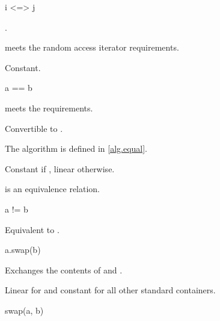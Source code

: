 \begin{itemdecl}
i <=> j
\end{itemdecl}

\begin{itemdescr}
\pnum
\result
{}.

\pnum
\constraints
{} meets the random access iterator requirements.

\pnum
\complexity
Constant.
\end{itemdescr}

%
\begin{itemdecl}
a == b
\end{itemdecl}

\begin{itemdescr}
\pnum
\expects
{} meets the  requirements.

\pnum
\result
Convertible to .

\pnum
\returns
{}

\begin{note}
The algorithm  is defined in \ref{alg.equal}.
\end{note}

\pnum
\complexity
Constant if , linear otherwise.

\pnum
\remarks
\tcode{==} is an equivalence relation.
\end{itemdescr}

%
\begin{itemdecl}
a != b
\end{itemdecl}

\begin{itemdescr}
\pnum
\effects
Equivalent to .
\end{itemdescr}

%
\begin{itemdecl}
a.swap(b)
\end{itemdecl}

\begin{itemdescr}
\pnum
\result
{}

\pnum
\effects
Exchanges the contents of  and .

\pnum
\complexity
Linear for  and constant for all other standard containers.
\end{itemdescr}

\begin{itemdecl}
swap(a, b)
\end{itemdecl}

